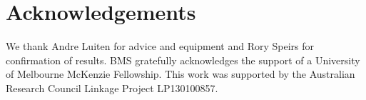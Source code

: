 \documentclass[10pt,letterpaper]{article}
\begin{document}
\section{Acknowledgements}
We thank Andre Luiten for advice and equipment and Rory Speirs for confirmation of results.
BMS gratefully acknowledges the support of a University of Melbourne McKenzie Fellowship.
This work was supported by the Australian Research Council Linkage Project LP130100857.
\end{document}
